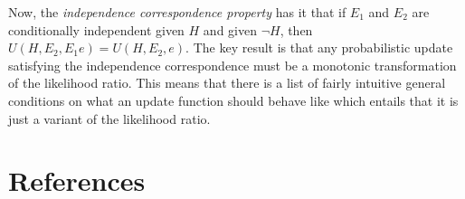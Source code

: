 \documentclass[
  10pt,
  dvipsnames,enabledeprecatedfontcommands]{scrartcl}
\newcommand{\n}{\neg}
\begin{document}
Now, the \emph{independence correspondence property} has it that if
\(E_1\) and \(E_2\) are conditionally independent given \(H\) and given
\(\n H\), then \(U(H, E_2, E_1e) = U(H, E_2, e)\). The key result is
that any probabilistic update satisfying the independence correspondence
must be a monotonic transformation of the likelihood ratio. This means
that there is a list of fairly intuitive general conditions on what an
update function should behave like which entails that it is just a
variant of the likelihood ratio.

\hypertarget{references}{%
\section*{References}\label{references}}
\end{document}
